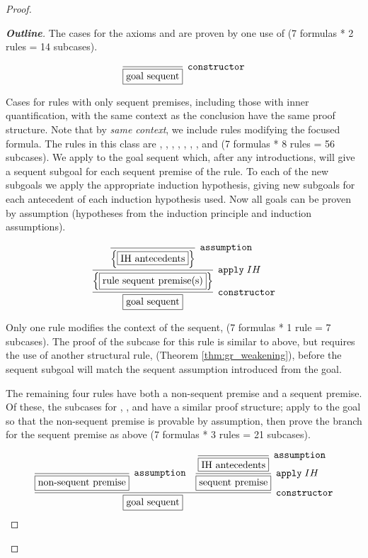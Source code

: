 \begin{proof}
\begin{proof}[\textbf{Outline}]



The cases for the axioms \rlnmst{} and \rlnmbmatch{} are proven by one use of  (7 formulas * 2 rules = 14 subcases).

{\small
$$
\infer[\coqtm{constructor}]{\fbox{goal sequent}}{}
$$
}

Cases for rules with only sequent premises, including those with inner quantification, with the same context as the conclusion have the same proof structure. Note that by \emph{same context}, we include rules modifying the focused formula. The rules in this class are \rlnmsand{}, \rlnmsall{}, \rlnmsalls{}, \rlnmbanda{}, \rlnmbandb{}, \rlnmbimp{}, \rlnmballs{}, and \rlnmbsome{} (7 formulas * 8 rules = 56 subcases). We apply  to the goal sequent which, after any introductions, will give a sequent subgoal for each sequent premise of the rule. To each of the new subgoals we apply the appropriate induction hypothesis, giving new subgoals for each antecedent of each induction hypothesis used. Now all goals can be proven by assumption (hypotheses from the induction principle and induction assumptions).

{\small
$$
\infer[\coqtm{constructor}]{\fbox{goal sequent}}{
	\infer[\coqtm{apply} \; IH]{\Big\{ \fbox{rule sequent premise(s)} \Big\}}{
	    \infer[\coqtm{assumption}]{\Big\{ \fbox{IH antecedents} \Big\}}{}
	}
}
$$
}

Only one rule modifies the context of the sequent, \rlnmsimp{} (7 formulas * 1 rule = 7 subcases). The proof of the subcase for this rule is similar to above, but requires the use of another structural rule,  (Theorem \ref{thm:gr_weakening}), before the sequent subgoal will match the sequent assumption introduced from the goal.

The remaining four rules have both a non-sequent premise and a sequent premise. Of these, the subcases for \rlnmsbc{}, \rlnmssome{}, and \rlnmball{} have a similar proof structure; apply  to the goal so that the non-sequent premise is provable by assumption, then prove the branch for the sequent premise as above (7 formulas * 3 rules = 21 subcases).


{\small
$$
\infer[\coqtm{constructor}]{\fbox{goal sequent}}{
	\infer[\coqtm{assumption}]{\fbox{non-sequent premise}}{}
	&
	\infer[\coqtm{apply} \; IH]{\fbox{sequent premise}}{
	    \infer[\coqtm{assumption}]{\fbox{IH antecedents}}{}
	}
}
$$
}


\end{proof}
\end{proof}
